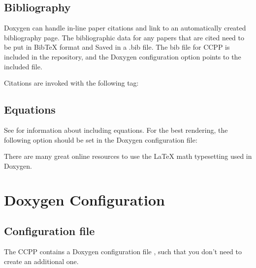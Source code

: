 \documentclass[letterpaper,10pt,english]{sphinxmanual}
\begin{document}
\subsection{Bibliography}
\label{\detokenize{ScientificDocRules:bibliography}}
Doxygen can handle in-line paper citations and link to an automatically created
bibliography page. The bibliographic data for any papers that are cited need to
be put in BibTeX format and Saved in a .bib file. The bib file for CCPP is
included in the repository, and the Doxygen configuration option
 points to the included file.

Citations are invoked with the following tag:

\begin{sphinxVerbatim}[commandchars=\\\{\}]
\end{sphinxVerbatim}


\subsection{Equations}
\label{\detokenize{ScientificDocRules:equations}}
See  for information
about including equations. For the best rendering, the following option
should be set in the Doxygen configuration file:

\begin{sphinxVerbatim}[commandchars=\\\{\}]
\end{sphinxVerbatim}

There are many great online resources to use the LaTeX math typesetting used in Doxygen.


\section{Doxygen Configuration}
\label{\detokenize{ScientificDocRules:doxygen-configuration}}

\subsection{Configuration file}
\label{\detokenize{ScientificDocRules:configuration-file}}
The CCPP contains a Doxygen configuration file
, such that you don’t need to
create an additional one.
\end{document}
